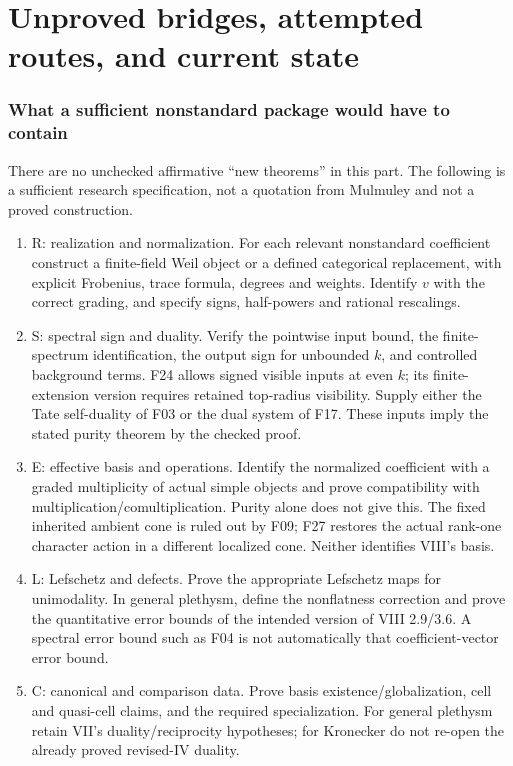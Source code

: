 \documentclass[11pt,a4paper]{article}
\newcommand{\fid}[1]{\textsf{#1}}\newcommand{\gate}[1]{\textsf{#1}}
\theoremstyle{named}\newtheorem{finding}{Finding}[section]
\theoremstyle{definition}\newtheorem{definition}[finding]{Definition}
\theoremstyle{remark}\newtheorem{remark}[finding]{Remark}
\begin{document}
\part{Unproved bridges, attempted routes, and current state}
\section{What a sufficient nonstandard package would have to contain}\label{sec:gates}
There are no unchecked affirmative ``new theorems'' in this part. The following is a sufficient research specification, not a quotation from Mulmuley and not a proved construction.

\begin{enumerate}
\item \gate{R: realization and normalization.} For each relevant nonstandard coefficient construct a finite-field Weil object or a defined categorical replacement, with explicit Frobenius, trace formula, degrees and weights. Identify $v$ with the correct grading, and specify signs, half-powers and rational rescalings.
\item \gate{S: spectral sign and duality.} Verify the pointwise input bound, the finite-spectrum identification, the output sign for unbounded $k$, and controlled background terms. F24 allows signed visible inputs at even $k$; its finite-extension version requires retained top-radius visibility. Supply either the Tate self-duality of \fid{F03} or the dual system of \fid{F17}. These inputs imply the stated purity theorem by the checked proof.
\item \gate{E: effective basis and operations.} Identify the normalized coefficient with a graded multiplicity of actual simple objects and prove compatibility with multiplication/comultiplication. Purity alone does not give this. The fixed inherited ambient cone is ruled out by \fid{F09}; F27 restores the actual rank-one character action in a different localized cone. Neither identifies VIII's basis.
\item \gate{L: Lefschetz and defects.} Prove the appropriate Lefschetz maps for unimodality. In general plethysm, define the nonflatness correction and prove the quantitative error bounds of the intended version of VIII 2.9/3.6. A spectral error bound such as \fid{F04} is not automatically that coefficient-vector error bound.
\item \gate{C: canonical and comparison data.} Prove basis existence/globalization, cell and quasi-cell claims, and the required specialization. For general plethysm retain VII's duality/reciprocity hypotheses; for Kronecker do not re-open the already proved revised-IV duality.

\end{enumerate}
\end{document}

